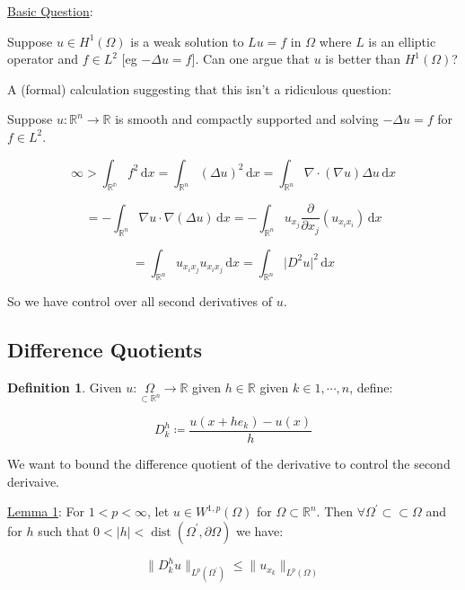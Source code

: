 \documentclass{article}
\theoremstyle{definition}
\newtheorem{definition}{Definition}
\begin{document}
\underline{Basic Question}:

Suppose \(u \in H^1(\Omega)\) is a weak solution to \(Lu = f\) in \(\Omega\) where \(L\) is an elliptic operator and \(f\in L^2\) [eg \(-\Delta u = f\)]. Can one argue that \(u\) is better than \(H^1(\Omega)\)?

A (formal) calculation suggesting that this isn't a ridiculous question:

Suppose \(u:\mathbb{R}^n \to \mathbb{R}\) is smooth and compactly supported and solving \(-\Delta u = f\) for \(f\in L^2\).

\[
    \infty > \int_{{\mathbb{R^n}}} f^2 \,\mathrm{d}x = \int_{{\mathbb{R}^{n}}} (\Delta u)^2 \,\mathrm{d}x = \int_{{\mathbb{R}^{n}}} \nabla \cdot (\nabla u) \Delta u \,\mathrm{d}x 
\]

\[
    = - \int_{{\mathbb{R}^{n}}} \nabla u \cdot \nabla(\Delta u) \,\mathrm{d}x = -\int_{{\mathbb{R}^{n}}} u_{x_j} \frac{\partial}{\partial x_j} (u_{x_i x_i}) \,\mathrm{d}x 
\]

\[
    = \int_{{\mathbb{R}^{n}}} u_{x_i x_j} u_{x_i x_j} \,\mathrm{d}x = \int_{{\mathbb{R}^{n}}} \vert D^2 u \vert ^ 2 \,\mathrm{d}x 
\]

So we have control over all second derivatives of \(u\).

\subsection*{Difference Quotients}

\begin{definition}
    Given \(u: \underset{\subset \mathbb{R} ^n}{\Omega} \to \mathbb{R} \) given \(h\in \mathbb{R} \) given \(k\in 1, \cdots , n\), define:

    \[
        D_k^h \coloneqq \frac{u(x+he_k)-u(x)}{h}
    \]
\end{definition}

We want to bound the difference quotient of the derivative to control the second derivaive.

\underline{Lemma 1}: For \(1 < p < \infty\), let \(u \in W^{1,p}(\Omega)\) for \(\Omega \subset \mathbb{R} ^n\). Then \(\forall \Omega^{\prime} \subset \subset \Omega\) and for \(h\) such that \(0 < \vert h \vert < \operatorname{dis t} (\Omega ^{\prime} , \partial \Omega)\) we have:

\[
    \lVert D^h_k u \rVert _{L^p(\Omega^{\prime})} \leq \lVert u_{x_k} \rVert _{L^p(\Omega)}
\]
\end{document}
